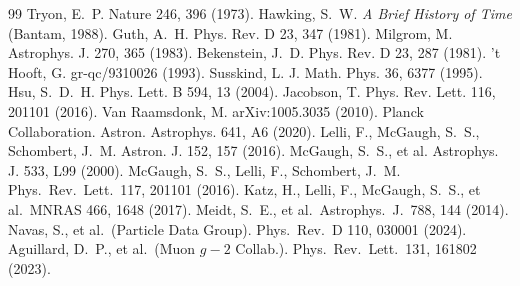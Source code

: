 \documentclass[twocolumn]{aastex631}
\begin{document}
\begin{thebibliography}{99}
 Tryon, E.~P. Nature 246, 396 (1973).
 Hawking, S.~W. \textit{A Brief History of Time} (Bantam, 1988).
 Guth, A.~H. Phys. Rev. D 23, 347 (1981).
 Milgrom, M. Astrophys. J. 270, 365 (1983).
 Bekenstein, J.~D. Phys. Rev. D 23, 287 (1981).
 't Hooft, G. gr-qc/9310026 (1993).
 Susskind, L. J. Math. Phys. 36, 6377 (1995).
 Hsu, S.~D.~H. Phys. Lett. B 594, 13 (2004).
 Jacobson, T. Phys. Rev. Lett. 116, 201101 (2016).
 Van Raamsdonk, M. arXiv:1005.3035 (2010).
 Planck Collaboration. Astron. Astrophys. 641, A6 (2020).
 Lelli, F., McGaugh, S.~S., Schombert, J.~M. Astron. J. 152, 157 (2016).
 McGaugh, S.~S., et al. Astrophys. J. 533, L99 (2000).
 McGaugh, S.~S., Lelli, F., Schombert, J.~M. Phys.\ Rev.\ Lett.\ 117, 201101 (2016).
 Katz, H., Lelli, F., McGaugh, S.~S., et al.\ MNRAS 466, 1648 (2017).
 Meidt, S.~E., et al.\ Astrophys.\ J.\ 788, 144 (2014).
 Navas, S., et al.\ (Particle Data Group). Phys.\ Rev.\ D 110, 030001 (2024).
 Aguillard, D.~P., et al.\ (Muon $g-2$ Collab.). Phys.\ Rev.\ Lett.\ 131, 161802 (2023).
\end{thebibliography}
\end{document}
